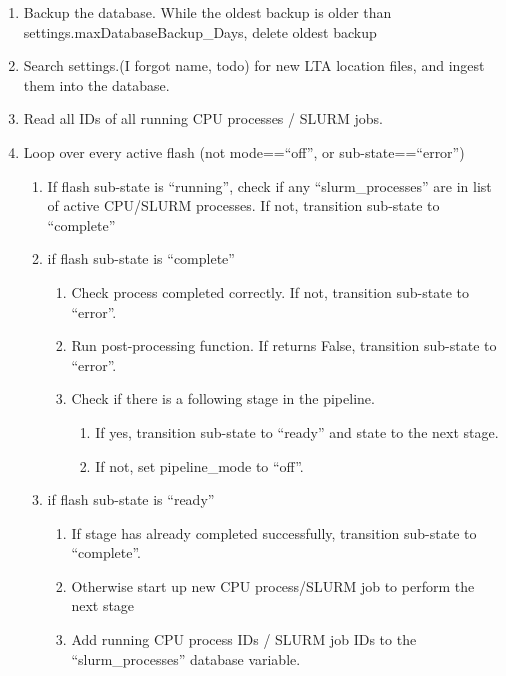 \documentclass[]{article}
\begin{document}
\begin{enumerate}
	\item Backup the database. While the oldest backup is older than settings.maxDatabaseBackup\_Days, delete oldest backup
	\item Search settings.(I forgot name, todo) for new LTA location files, and ingest them into the database.
	\item Read all IDs of all running CPU processes / SLURM jobs.
	\item Loop over every active flash (not mode==``off'',  or sub-state==``error'')
	\begin{enumerate}
		\item If flash sub-state is ``running'', check if any ``slurm\_processes''  are in list of active CPU/SLURM processes. If not, transition sub-state to ``complete''
		
		\item if flash sub-state is ``complete''
		\begin{enumerate}
			\item Check process completed correctly. If not, transition sub-state to ``error''. 
			\item Run post-processing function. If returns False, transition sub-state to ``error''.
			\item Check if there is a following stage in the pipeline.
			\begin{enumerate}
				\item If yes, transition sub-state to ``ready'' and state to the next stage.
				\item If not, set pipeline\_mode to ``off''.
			\end{enumerate}
		
		\end{enumerate}
	
		\item if flash sub-state is ``ready''
		\begin{enumerate}
			\item If stage has already completed successfully, transition sub-state to ``complete''.
			\item Otherwise start up new CPU process/SLURM job to perform the next stage
			\item Add running CPU process IDs / SLURM job IDs to the ``slurm\_processes'' database variable.
		\end{enumerate}
		
	\end{enumerate}
	
\end{enumerate}
\end{document}
